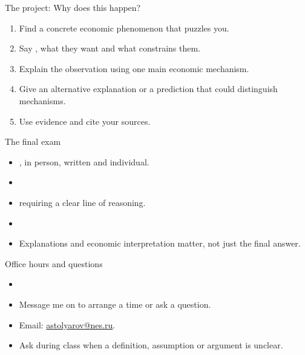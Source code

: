 \documentclass[handout,aspectratio=169,10pt]{beamer}
\begin{document}
\begin{frame}[label=project]{The project: Why does this happen?}
\begin{enumerate}[<+->]
\item Find a concrete economic phenomenon that puzzles you.
\item Say , what they want and what constrains them.
\item Explain the observation using one main economic mechanism.
\item Give an alternative explanation or a prediction that could distinguish mechanisms.
\item Use evidence and cite your sources.
\end{enumerate}
\end{frame}

\begin{frame}[label=exam]{The final exam}
\begin{itemize}[<+->]
\item {}, in person, written and individual.
\item {}
\item {} requiring a clear line of reasoning.
\item {}
\item Explanations and economic interpretation matter, not just the final answer.
\end{itemize}
\end{frame}

\begin{frame}[label=contact]{Office hours and questions}
\begin{itemize}[<+->]
\item {}
\item Message me on  to arrange a time or ask a question.
\item Email: \href{mailto:astolyarov@nes.ru}{astolyarov@nes.ru}.
\item Ask during class when a definition, assumption or argument is unclear.
\end{itemize}
\end{frame}
\end{document}
